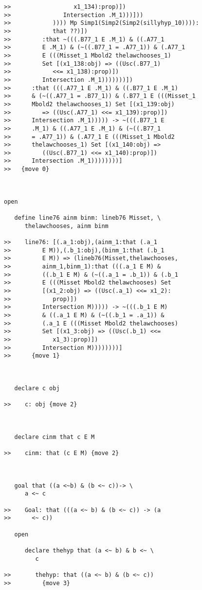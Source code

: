 \documentclass[12pt]{article}
\begin{document}
\begin{verbatim}
>>                  x1_134):prop)])
>>               Intersection .M_1)))]))
>>            )))) Mp Simp1(Simp2(Simp2(sillyhyp_10)))):
>>            that ??)])
>>         :that ~(((.B77_1 E .M_1) & ((.A77_1
>>         E .M_1) & (~((.B77_1 = .A77_1)) & (.A77_1
>>         E (((Misset_1 Mbold2 thelawchooses_1)
>>         Set [(x1_138:obj) => ((Usc(.B77_1)
>>            <<= x1_138):prop)])
>>         Intersection .M_1)))))))])
>>      :that (((.A77_1 E .M_1) & ((.B77_1 E .M_1)
>>      & (~((.A77_1 = .B77_1)) & (.B77_1 E (((Misset_1
>>      Mbold2 thelawchooses_1) Set [(x1_139:obj)
>>         => ((Usc(.A77_1) <<= x1_139):prop)])
>>      Intersection .M_1))))) -> ~(((.B77_1 E
>>      .M_1) & ((.A77_1 E .M_1) & (~((.B77_1
>>      = .A77_1)) & (.A77_1 E (((Misset_1 Mbold2
>>      thelawchooses_1) Set [(x1_140:obj) =>
>>         ((Usc(.B77_1) <<= x1_140):prop)])
>>      Intersection .M_1))))))))]
>>   {move 0}



open

   define line76 ainm binm: lineb76 Misset, \
      thelawchooses, ainm binm

>>    line76: [(.a_1:obj),(ainm_1:that (.a_1
>>         E M)),(.b_1:obj),(binm_1:that (.b_1
>>         E M)) => (lineb76(Misset,thelawchooses,
>>         ainm_1,binm_1):that (((.a_1 E M) &
>>         ((.b_1 E M) & (~((.a_1 = .b_1)) & (.b_1
>>         E (((Misset Mbold2 thelawchooses) Set
>>         [(x1_2:obj) => ((Usc(.a_1) <<= x1_2):
>>            prop)])
>>         Intersection M))))) -> ~(((.b_1 E M)
>>         & ((.a_1 E M) & (~((.b_1 = .a_1)) &
>>         (.a_1 E (((Misset Mbold2 thelawchooses)
>>         Set [(x1_3:obj) => ((Usc(.b_1) <<=
>>            x1_3):prop)])
>>         Intersection M))))))))]
>>      {move 1}



   declare c obj

>>    c: obj {move 2}



   declare cinm that c E M

>>    cinm: that (c E M) {move 2}



   goal that ((a <~b) & (b <~ c))-> \
      a <~ c

>>    Goal: that (((a <~ b) & (b <~ c)) -> (a
>>      <~ c))

   open

      declare thehyp that (a <~ b) & b <~ \
         c

>>       thehyp: that ((a <~ b) & (b <~ c))
>>         {move 3}




\end{verbatim}
\end{document}
